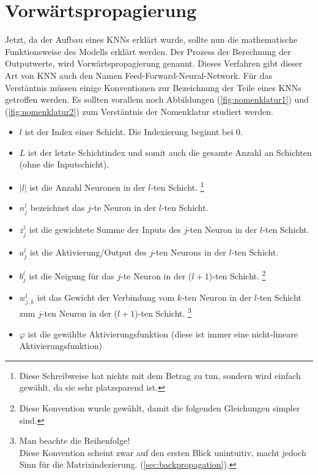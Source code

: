 \section{Vorwärtspropagierung}
Jetzt, da der Aufbau eines KNNs erklärt wurde, sollte nun die mathematische Funktionsweise
des Modells erklärt werden. Der Prozess der Berechnung der Outputwerte, wird
Vorwärtspropagierung genannt. Dieses Verfahren gibt dieser Art von KNN auch den
Namen Feed-Forward-Neural-Network. Für das Verstäntnis müssen einige Konventionen zur
Bezeichnung der Teile eines KNNs getroffen werden. Es sollten vorallem noch
Abbildungen (\ref{fig:nomenklatur1}) und (\ref{fig:nomenklatur2}) zum
Verstäntnis der Nomenklatur studiert werden.
\begin{itemize}
\item{$l$ ist der Index einer Schicht. Die Indexierung beginnt bei 0.}
\item{$L$ ist der letzte Schichtindex und somit auch die gesamte Anzahl an
    Schichten (ohne die Inputschicht).}
\item{$|l|$ ist die Anzahl Neuronen in der $l$-ten Schicht.
    \footnote{
      Diese Schreibweise hat nichts mit dem Betrag zu tun, sondern wird einfach
      gewählt, da sie sehr platzsparend ist.
    }
  }
\item{$n_j^l$ bezeichnet das $j$-te Neuron in der $l$-ten Schicht.}
\item{$z_j^l$ ist die gewichtete Summe der Inputs des $j$-ten Neuron in der $l$-ten Schicht.}
\item{$a_j^l$ ist die Aktivierung/Output des $j$-ten Neurons in der $l$-ten Schicht.}
\item{$b_j^l$ ist die Neigung für das $j$-te Neuron in der ($l+1$)-ten Schicht.
    \footnote{
      Diese Konvention wurde gewählt, damit die folgenden Gleichungen simpler sind.
    }
  }
\item{$w_{j,k}^l$ ist das Gewicht der Verbindung vom $k$-ten Neuron
    in der $l$-ten Schicht zum $j$-ten Neuron in der ($l+1$)-ten Schicht.
    \footnote{
      Man beachte die Reihenfolge!\\
      Diese Konvention scheint zwar auf den ersten Blick unintuitiv, macht jedoch
      Sinn für die Matrixindezierung.
      (\ref{sec:backpropagation}).
    }
  }
\item{$\varphi$ ist die gewählte Aktivierungsfunktion (diese ist immer eine
    nicht-lineare Aktivierungsfunktion)}
\end{itemize}

